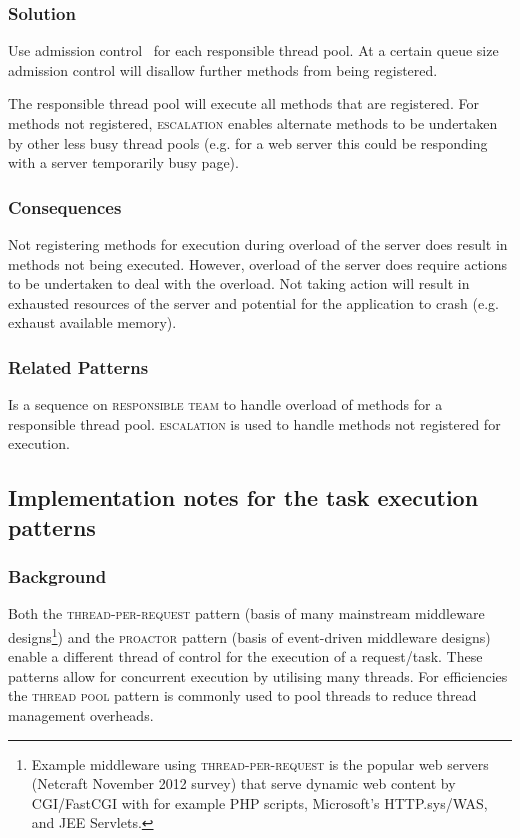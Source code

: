 \documentclass[prodmode]{style/acmlarge}
\begin{document}
\subsubsection*{\textbf{Solution}} Use admission control~\cite{seda} for each
responsible thread pool.  At a certain queue size admission control will
disallow further methods from being registered.

The responsible thread pool will execute all methods that are registered.  For
methods not registered, \textsc{escalation} enables alternate methods to be
undertaken by other less busy thread pools (e.g. for a web server this could be
responding with a server temporarily busy page).

\subsubsection*{Consequences} Not registering methods for execution during
overload of the server does result in methods not being executed.  However,
overload of the server does require actions to be undertaken to deal with the
overload.  Not taking action will result in exhausted resources of the server
and potential for the application to crash (e.g. exhaust available memory).

\subsubsection*{Related Patterns} Is a sequence on \textsc{responsible team} to
handle overload of methods for a responsible thread pool.  \textsc{escalation}
is used to handle methods not registered for execution.



\subsection{\textbf{Implementation notes for the task execution patterns}}

\subsubsection*{Background}

Both the \textsc{thread-per-request} pattern \cite{thread-per-request} (basis of
many mainstream middleware designs\footnote{Example middleware using
\textsc{thread-per-request} is the popular web servers (Netcraft November 2012
survey) that serve dynamic web content by CGI/FastCGI with for example PHP scripts,
Microsoft's HTTP.sys/WAS, and JEE Servlets.}) and the \textsc{proactor} pattern
\cite{proactor} (basis of event-driven middleware designs) enable a different
thread of control for the execution of a request/task.  These patterns allow for
concurrent execution by utilising many threads.  For efficiencies the
\textsc{thread pool} pattern \cite{thread-per-request} is commonly used to pool
threads to reduce thread management overheads.
\end{document}
